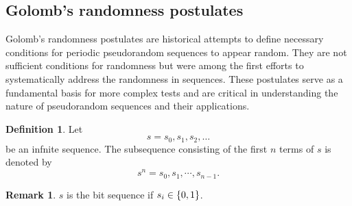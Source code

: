 \documentclass[12pt,openany]{book}
\theoremstyle{definition}
\newtheorem{definition}{Definition}[chapter]
\newtheorem{remark}{Remark}[chapter]
\begin{document}
	\newpage
	\subsection{Golomb’s randomness postulates}
	Golomb’s randomness postulates are historical attempts to define necessary conditions for periodic pseudorandom sequences to appear random. They are not sufficient conditions for randomness but were among the first efforts to systematically address the randomness in sequences. These postulates serve as a fundamental basis for more complex tests and are critical in understanding the nature of pseudorandom sequences and their applications.
	
	\begin{tcolorbox}[colback=white,colframe=defcolor,arc=5pt,title={\color{white}\bf }]
		\begin{definition}
			Let \[
			s=s_0,s_1,s_2,\dots
			\] be an infnite sequence. The subsequence consisting of the first $n$ terms of $s$ is denoted by \[
			s^n=s_0,s_1,\cdots,s_{n-1}.
			\]
		\end{definition}
	\end{tcolorbox}
	\begin{remark}
		$s$ is the bit sequence if $s_i\in\set{0,1}$.
	\end{remark}
	
\end{document}
